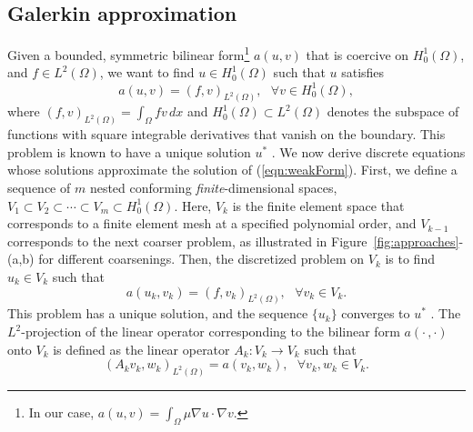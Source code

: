 \documentclass[times]{nlaauth}
\begin{document}
\subsection{Galerkin approximation} \label{subsec:galerkin}

Given a bounded, symmetric bilinear form\footnote{In our case,
$a(u,v)=\int_\Omega \mu\nabla u \cdot \nabla v$.} $a(u,v)$ that is
coercive
on $H_0^{1}(\Omega)$, and $f \in L^{2}(\Omega)$, we want to find $u
\in H_0^{1}(\Omega)$ such that $u$ satisfies
\begin{equation}
\label{eqn:weakForm}
a(u,v) =  (f,v)_{L^2(\Omega)}, \ \ \ \forall v \in H_0^{1}(\Omega),
\end{equation}
where $(f,v)_{L^2(\Omega)} = \int_\Omega fv\,dx$ and
$H_0^1(\Omega)\subset L^2(\Omega)$ denotes the subspace of
functions with square integrable derivatives that vanish on the
boundary.
This problem is known to have a unique solution $u^*$ \cite{BrennerScott94}. 
We now derive discrete equations whose solutions
approximate the solution of
(\ref{eqn:weakForm}). First, we define a sequence of $m$ nested conforming
{\em finite}-dimensional spaces, $V_1 \subset V_2 \subset \cdots \subset V_m \subset
H_0^{1}(\Omega)$.
Here, $V_k$ is the finite element space that corresponds to a finite element mesh
at a specified
polynomial order, and $V_{k-1}$ corresponds to the next coarser
problem,
as illustrated  in Figure~\ref{fig:approaches}-(a,b) for different coarsenings.  Then, the discretized problem on $V_k$ is to find
$u_k \in V_k$ such that
\begin{equation}
\label{eqn:galerkinForm}
a(u_{k},v_k) = (f,v_k)_{L^2(\Omega)}, \ \ \ \forall v_k \in V_k.
\end{equation}
This problem has a unique solution, and the sequence
$\{u_k\}$ converges to $u^*$ \cite{BrennerScott94}.
%
The $L^2$-projection of the linear operator corresponding to the
bilinear form $a(\cdot\,,\cdot)$ onto $V_k$ is defined as the linear
operator $A_k : V_{k} \rightarrow V_{k}$ such that
\begin{equation}
\label{eqn:fematDef}
(A_{k} v_k,w_k)_{L^2(\Omega)} = a(v_k,w_k),  \ \ \ \forall v_k,w_k \in V_k.
\end{equation}
\end{document}
